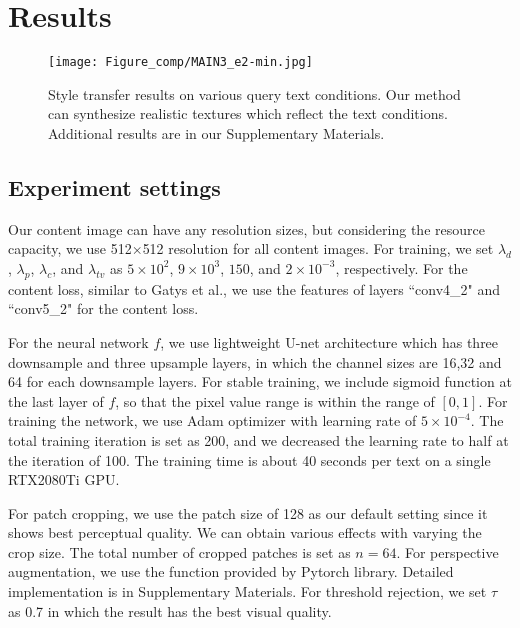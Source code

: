 \documentclass[10pt,twocolumn,letterpaper]{article}
\begin{document}
\section{Results}

\begin{figure*}[t]
\vspace*{-0.5cm}
\centering
\texttt{[image: Figure\_comp/MAIN3\_e2-min.jpg]}
\vspace*{-0.5cm}
\caption{Style transfer results on various query text conditions. Our method can synthesize realistic textures which reflect the text conditions.  Additional results are in our Supplementary Materials.
}
\label{fig:ours}
\end{figure*}



\subsection{Experiment settings}
Our content image can have any resolution sizes, but considering the resource capacity, we use 512$\times$512 resolution for all content images. For training, we set $\lambda_d$, $\lambda_p$, $\lambda_c$, and $\lambda_{tv}$ as $5\times10^2$, $9\times10^3$,  $150$, and $2\times10^{-3}$, respectively. 
For the content loss, similar to Gatys et al.\cite{gatys}, we use the features of layers ``conv4\_2" and ``conv5\_2" for the content loss.

For the neural network $f$, we use lightweight U-net\cite{unet} architecture which has three downsample and three upsample layers, in which the channel sizes are 16,32 and 64 for each downsample layers. For stable training, we include sigmoid function at the last layer of $f$, so that the pixel value range is within the range of $[0,1]$. For training the network, we use Adam optimizer with learning rate of $5\times10^{-4}$. The total training iteration is set as 200, and we decreased the learning rate to half at the iteration of 100. {The training time is  about 40 seconds per text on a single RTX2080Ti GPU.} 


For patch cropping, we use the patch size of 128 as our default setting since it shows best perceptual quality. We can obtain various effects with varying the crop size. The total number of cropped patches is set as $n=64$. 
For perspective augmentation, we use the function provided by Pytorch library. Detailed implementation is in Supplementary Materials.
For threshold rejection, we set $\tau$ as 0.7 in which the result has the best visual quality. 
\end{document}
